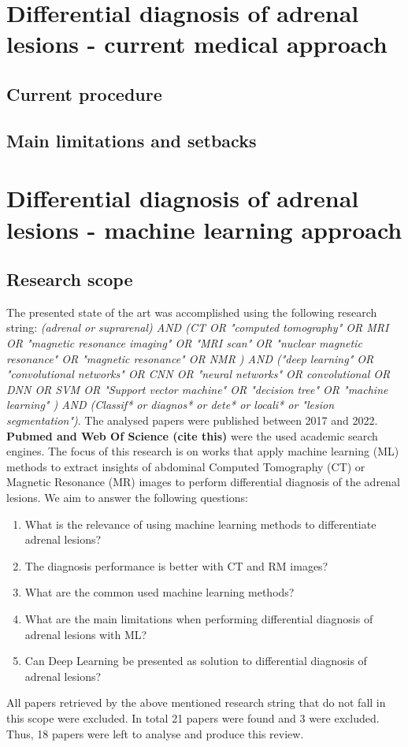 \documentclass{article}
\begin{document}
\section{Differential diagnosis of adrenal lesions - current medical approach}

\subsection{Current procedure}

\subsection{Main limitations and setbacks}

\section{Differential diagnosis of adrenal lesions - machine learning approach}

\subsection{Research scope}

The presented state of the art was accomplished using the following research string: \textit{(adrenal or suprarenal) AND (CT OR "computed tomography" OR MRI OR "magnetic resonance imaging" OR "MRI scan" OR "nuclear magnetic resonance" OR "magnetic resonance" OR NMR ) AND ("deep learning" OR "convolutional networks" OR CNN OR "neural networks" OR convolutional OR DNN OR SVM OR "Support vector machine" OR "decision tree" OR "machine learning" ) AND (Classif* or diagnos* or dete* or locali* or "lesion segmentation")}. The analysed papers were published between 2017 and 2022. \textbf{Pubmed and Web Of Science (cite this)} were the used academic search engines.
The focus of this research is on works that apply machine learning (ML) methods to extract insights of abdominal Computed Tomography (CT) or Magnetic Resonance (MR) images to perform differential diagnosis of the adrenal lesions. We aim to answer the following questions:
\begin{enumerate}
    \item What is the relevance of using machine learning methods to differentiate adrenal lesions?
    \item The diagnosis performance is better with CT and RM images?
    \item What are the common used machine learning methods?
    \item What are the main limitations when performing differential diagnosis of adrenal lesions with ML?
    \item Can Deep Learning be presented as solution to differential diagnosis of adrenal lesions?
\end{enumerate}
All papers retrieved by the above mentioned research string that do not fall in this scope were excluded.
In total 21 papers were found and 3 were excluded. Thus, 18 papers were left to analyse and produce this review.
\end{document}
